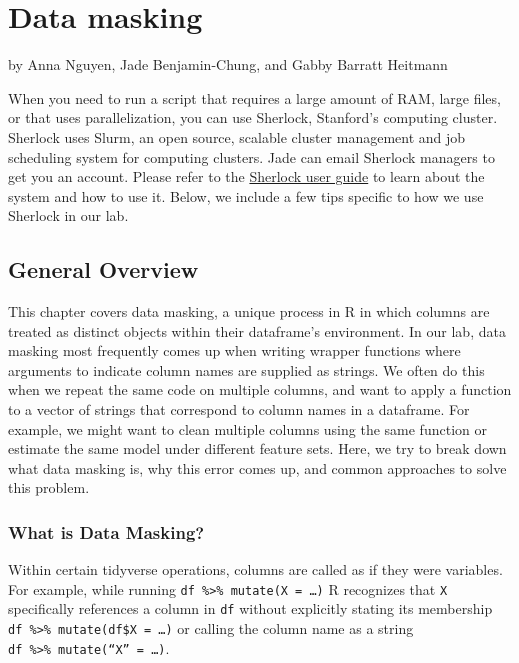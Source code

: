 \documentclass[
]{book}
\begin{document}
\chapter{Data masking}\label{data-masking}

by Anna Nguyen, Jade Benjamin-Chung, and Gabby Barratt Heitmann

When you need to run a script that requires a large amount of RAM, large files, or that uses parallelization, you can use Sherlock, Stanford's computing cluster. Sherlock uses Slurm, an open source, scalable cluster management and job scheduling system for computing clusters. Jade can email Sherlock managers to get you an account. Please refer to the \href{https://www.sherlock.stanford.edu/docs/overview/introduction/}{Sherlock user guide} to learn about the system and how to use it. Below, we include a few tips specific to how we use Sherlock in our lab.

\section{General Overview}\label{general-overview}

This chapter covers data masking, a unique process in R in which columns are treated as distinct objects within their dataframe's environment. In our lab, data masking most frequently comes up when writing wrapper functions where arguments to indicate column names are supplied as strings. We often do this when we repeat the same code on multiple columns, and want to apply a function to a vector of strings that correspond to column names in a dataframe. For example, we might want to clean multiple columns using the same function or estimate the same model under different feature sets. Here, we try to break down what data masking is, why this error comes up, and common approaches to solve this problem.

\subsection{What is Data Masking?}\label{what-is-data-masking}

Within certain tidyverse operations, columns are called as if they were variables. For example, while running \texttt{df\ \%\textgreater{}\%\ mutate(X\ =\ …)} R recognizes that \texttt{X} specifically references a column in \texttt{df} without explicitly stating its membership \texttt{df\ \%\textgreater{}\%\ mutate(df\$X\ =\ …)} or calling the column name as a string \texttt{df\ \%\textgreater{}\%\ mutate(“X”\ =\ …)}.
\end{document}
